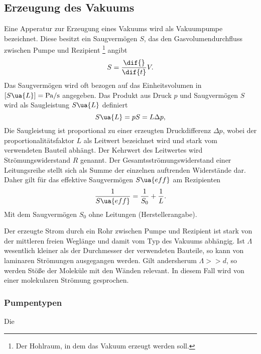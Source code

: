 \subsection{Erzeugung des Vakuums}
Eine Apperatur zur Erzeugung eines Vakuums wird als Vakuumpumpe bezeichnet. Diese besitzt ein
Saugvermögen $S$, das den Gasvolumendurchfluss zwischen Pumpe und Rezipient \footnote{Der Hohlraum, in dem das Vakuum erzeugt werden soll.}
angibt
\begin{equation}
  S = \frac{\dif{}}{\dif{t}} V.
\end{equation}
Das Saugvermögen wird oft bezogen auf das Einheitsvolumen in $[S\ua{L}] = \si{\pascal \per \second}$ angegeben.
Das Produkt aus Druck $p$ und Saugvermögen $S$ wird als Saugleistung $S\ua{L}$ definiert
\begin{equation}
  S\ua{L} = p S = L \Delta p ,
\end{equation}
Die Saugleistung ist proportional zu einer erzeugten Druckdifferenz $\Delta p$,
wobei der proportionalitätsfaktor $L$ als Leitwert bezeichnet wird und stark vom verwendeten Bauteil abhängt.
Der Kehrwert des Leitwertes wird Strömungswiderstand $R$ genannt. Der Gesamtsströmungswiderstand einer Leitungsreihe
stellt sich als Summe der einzelnen auftrenden Widerstände dar. Daher gilt für das effektive Saugvermögen $S\ua{eff}$ am Rezipienten
\begin{equation}
 \frac{1}{S\ua{eff}} = \frac{1}{S_0} + \frac{1}{L}.
 \label{eq: effektives_saugvermögen}
\end{equation}
Mit dem Saugvermögen $S_0$ ohne Leitungen (Herstellerangabe).

Der erzeugte Strom durch ein Rohr zwischen Pumpe und Rezipient ist stark von der mittleren freien Weglänge
und damit vom Typ des Vakuums abhängig. Ist $\Lambda$ wesentlich
kleiner als der Durchmesser der verwendeten Bauteile, so kann von laminaren Strömungen ausgegangen werden. Gilt andersherum
$\Lambda >> d$, so werden Stöße der Moleküle mit den Wänden relevant. In diesem Fall wird von einer molekularen Strömung gesprochen.


\subsubsection{Pumpentypen}
Die


